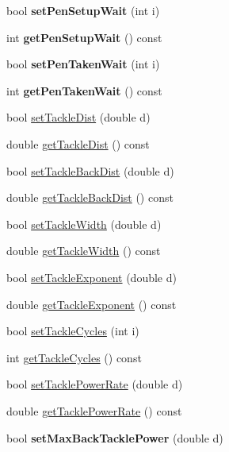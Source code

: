 \begin{DoxyCompactItemize}
\item 
bool {\bfseries set\+Pen\+Setup\+Wait} (int i)\hypertarget{classServerSettings_a50a8d6545918f92c30c8bde8450940c6}{}\label{classServerSettings_a50a8d6545918f92c30c8bde8450940c6}

\item 
int {\bfseries get\+Pen\+Setup\+Wait} () const \hypertarget{classServerSettings_a90717ee81afabd098ff32ebfbc3c6f9f}{}\label{classServerSettings_a90717ee81afabd098ff32ebfbc3c6f9f}

\item 
bool {\bfseries set\+Pen\+Taken\+Wait} (int i)\hypertarget{classServerSettings_a1b35ffa095683369a368ae6b187a76f3}{}\label{classServerSettings_a1b35ffa095683369a368ae6b187a76f3}

\item 
int {\bfseries get\+Pen\+Taken\+Wait} () const \hypertarget{classServerSettings_a59a2a711ef3fa1434d39d153fa305615}{}\label{classServerSettings_a59a2a711ef3fa1434d39d153fa305615}

\item 
bool \hyperlink{classServerSettings_afc7ff765cf6dd3940cd839c98a49384b}{set\+Tackle\+Dist} (double d)
\item 
double \hyperlink{classServerSettings_af3a8871883dfd17428fd5cf0e5be29e5}{get\+Tackle\+Dist} () const 
\item 
bool \hyperlink{classServerSettings_a4db5b82416c075b8c848c1d08dbb03aa}{set\+Tackle\+Back\+Dist} (double d)
\item 
double \hyperlink{classServerSettings_a0b93d810c1367f09c72d767c5b1c9ede}{get\+Tackle\+Back\+Dist} () const 
\item 
bool \hyperlink{classServerSettings_a56db9e44287ad34d288dc779dff4946f}{set\+Tackle\+Width} (double d)
\item 
double \hyperlink{classServerSettings_a0a4553abb2f0eba3fd6d522e026e1434}{get\+Tackle\+Width} () const 
\item 
bool \hyperlink{classServerSettings_a3137d20ebc1cc883cb05c809ff065135}{set\+Tackle\+Exponent} (double d)
\item 
double \hyperlink{classServerSettings_a1a27fc1e673da5fa4c24bac23a973a07}{get\+Tackle\+Exponent} () const 
\item 
bool \hyperlink{classServerSettings_aec8837f6609b394c8d93bbe3290a8d08}{set\+Tackle\+Cycles} (int i)
\item 
int \hyperlink{classServerSettings_aa09836ed36a8aa91555a2924802af6f2}{get\+Tackle\+Cycles} () const 
\item 
bool \hyperlink{classServerSettings_a1e2a3d629c4413ac87581b438e379ae2}{set\+Tackle\+Power\+Rate} (double d)
\item 
double \hyperlink{classServerSettings_a67bd8680bbab8c242a6ebe662d93f73d}{get\+Tackle\+Power\+Rate} () const 
\item 
bool {\bfseries set\+Max\+Back\+Tackle\+Power} (double d)\hypertarget{classServerSettings_af41df6c5b4efaa504163e1cd7df2f6df}{}\label{classServerSettings_af41df6c5b4efaa504163e1cd7df2f6df}


\end{DoxyCompactItemize}
